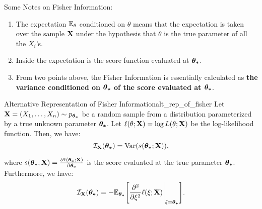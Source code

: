\begin{remark}
    Some Notes on Fisher Information:
    \begin{enumerate}
        \item The expectation $\mathbb{E}_\theta$ conditioned on $\theta$ means that the expectation is taken over the sample ${\bf X}$ under the hypothesis that $\theta$ is the true parameter of all the $X_i$'s. 

        \item Inside the expectation is the score function evaluated at $\boldsymbol{\theta_*}$.
        \item From two points above, the Fisher Information is essentially calculated as \textbf{the variance conditioned on $\boldsymbol{\theta_*}$ of the score evaluated at $\boldsymbol{\theta_*}$}.
    \end{enumerate} 
\end{remark} 

\begin{proposition}{Alternative Representation of Fisher Information}{alt_rep_of_fisher}
    Let ${\bf X}=(X_1, \dots, X_n) \sim p_{\boldsymbol{\theta_*}}$ be a random sample from a distribution parameterized by a true unknown parameter $\boldsymbol{\theta_*}$. Let $\ell(\theta;{\bf X})=\log L(\theta;{\bf X})$ be the log-likelihood function. Then, we have:
    \begin{equation}
        \mathcal{I}_{{\bf X}}(\boldsymbol{\theta_*}) = \mathrm{Var}(s(\boldsymbol{\theta_*};{\bf X})), 
    \end{equation} 

    \noindent where $s(\boldsymbol{\theta_*};{\bf X})=\frac{\partial\ell(\boldsymbol{\theta_*};{\bf X})}{\partial\boldsymbol{\theta_*}}$ is the score evaluated at the true parameter $\boldsymbol{\theta_*}$. Furthermore, we have:
    \begin{equation}
        \mathcal{I}_{{\bf X}}(\boldsymbol{\theta_*}) = -\mathbb{E}_{\boldsymbol{\theta_*}}\Bigg[ \frac{\partial^2}{\partial\xi^2}\ell(\xi;{\bf X})\Bigg|_{\xi=\boldsymbol{\theta_*}} \Bigg].
    \end{equation} 
\end{proposition} 

